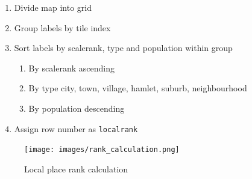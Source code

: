 \noindent\begin{minipage}[t]{0.48\linewidth}
    \vspace{0pt}
    \begin{enumerate}  
        \item Divide map into grid
        \item Group labels by tile index
        \item Sort labels by scalerank, type and population within group
        \begin{enumerate}
            \item By scalerank ascending
            \item By type city, town, village, hamlet, suburb, neighbourhood
            \item By population descending
        \end{enumerate}
        \item Assign row number as \texttt{localrank}
    \end{enumerate}
\end{minipage}
\hfill
\begin{minipage}[t]{0.48\linewidth}
    \vspace{-10pt}
    \begin{figure}[H]
    \centering
    \texttt{[image: images/rank\_calculation.png]}
    \caption{Local place rank calculation}
    \end{figure}
\end{minipage}